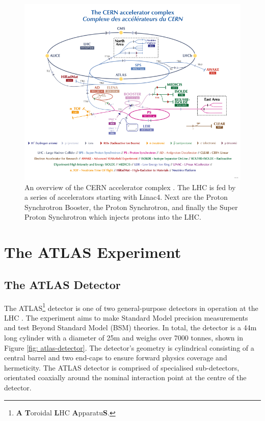 \begin{figure}[htb!]
\includegraphics[width=\textwidth]{images/2-LHC-ATLAS/accelerator_complex.pdf}
\caption{An overview of the CERN accelerator complex \cite{CERN:2012:accelerators}. The \ac{LHC} is fed by a series of accelerators starting with Linac4. Next are the Proton Synchrotron Booster, the Proton Synchrotron, and finally the Super Proton Synchrotron which injects protons into the \ac{LHC}.}
\label{fig: accelerator-complex}
\end{figure}



\section{The ATLAS Experiment}
\label{atlas-section}

\subsection{The ATLAS Detector}
The ATLAS\footnote{\textbf{A} \textbf{T}oroidal \textbf{L}HC \textbf{A}pparatu\textbf{S}.} detector is one of two general-purpose detectors in operation at the \ac{LHC} \cite{PERF-2007-01}. The experiment aims to make Standard Model precision measurements and test Beyond Standard Model (BSM) theories. In total, the detector is a 44m long cylinder with a diameter of 25m and weighs over 7000 tonnes, shown in Figure \ref{fig: atlas-detector}. The detector’s geometry is cylindrical consisting of a central barrel and two end-caps to ensure forward physics coverage and hermeticity. The ATLAS detector is comprised of specialised sub-detectors, orientated coaxially around the nominal interaction point at the centre of the detector. 

